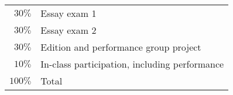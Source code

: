 \documentclass{article}
\makeatletter
\def\@AssignmentValues{}
\newcommand{\setAssignmentValue}[2]{%
	\def\@NextValues{$#1\%$ & #2\tabularnewline}%
	\edef\@AssignmentValues{\@AssignmentValues\@NextValues}%
}
\newcommand{\printAssignmentValues}{%
	\begin{tabular}{rl}
	\toprule
	\@AssignmentValues
	\midrule
	$100\%$ & Total\\
	\bottomrule
	\end{tabular}%
}
\makeatother
\begin{document}
\setAssignmentValue{30}{Essay exam 1}
\setAssignmentValue{30}{Essay exam 2}
\setAssignmentValue{30}{Edition and performance group project}
\setAssignmentValue{10}{In-class participation, including performance}

\printAssignmentValues
\end{document}
